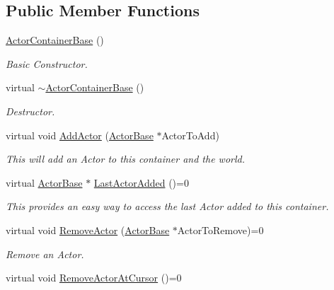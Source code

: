 \subsection*{Public Member Functions}
\begin{DoxyCompactItemize}
\item 
\hyperlink{classphys_1_1ActorContainerBase_ac17a442ad8aacba14d1cef956c0ddbb8}{ActorContainerBase} ()
\begin{DoxyCompactList}\small\item\em Basic Constructor. \item\end{DoxyCompactList}\item 
virtual \hyperlink{classphys_1_1ActorContainerBase_aa5eac062dd70a220a4ec6df973c6f258}{$\sim$ActorContainerBase} ()
\begin{DoxyCompactList}\small\item\em Destructor. \item\end{DoxyCompactList}\item 
virtual void \hyperlink{classphys_1_1ActorContainerBase_af32c2adf4c0f928604ce05e20b07ef66}{AddActor} (\hyperlink{classphys_1_1ActorBase}{ActorBase} $\ast$ActorToAdd)
\begin{DoxyCompactList}\small\item\em This will add an Actor to this container and the world. \item\end{DoxyCompactList}\item 
virtual \hyperlink{classphys_1_1ActorBase}{ActorBase} $\ast$ \hyperlink{classphys_1_1ActorContainerBase_a6ccc6d058bcbbe0b9a638e28fb136477}{LastActorAdded} ()=0
\begin{DoxyCompactList}\small\item\em This provides an easy way to access the last Actor added to this container. \item\end{DoxyCompactList}\item 
virtual void \hyperlink{classphys_1_1ActorContainerBase_a579e049a3190fcc1f951b3212c209616}{RemoveActor} (\hyperlink{classphys_1_1ActorBase}{ActorBase} $\ast$ActorToRemove)=0
\begin{DoxyCompactList}\small\item\em Remove an Actor. \item\end{DoxyCompactList}\item 
virtual void \hyperlink{classphys_1_1ActorContainerBase_a60f37a056e8750f3b389c5ceed14520c}{RemoveActorAtCursor} ()=0

\end{DoxyCompactItemize}
